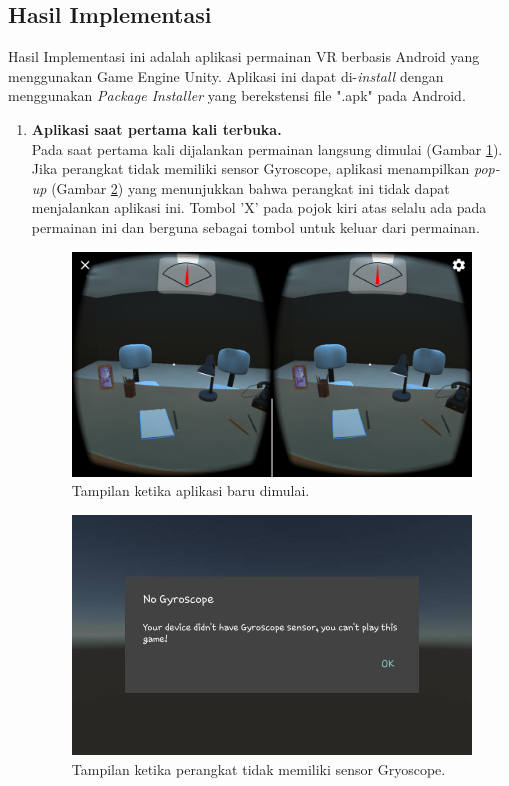 \subsection{Hasil Implementasi}

Hasil Implementasi ini adalah aplikasi permainan VR berbasis Android yang menggunakan Game Engine Unity. Aplikasi ini dapat di-\textit{install} dengan menggunakan \textit{Package Installer} yang berekstensi file ".apk" pada Android.

\begin{enumerate}
    \item \textbf{Aplikasi saat pertama kali terbuka.}\\
    Pada saat pertama kali dijalankan permainan langsung dimulai (Gambar \ref{fig:aplikasi_mulai}). Jika perangkat tidak memiliki sensor Gyroscope, aplikasi menampilkan \textit{pop-up} (Gambar \ref{fig:no_gyroscope}) yang menunjukkan bahwa perangkat ini tidak dapat menjalankan aplikasi ini. Tombol 'X' pada pojok kiri atas selalu ada pada permainan ini dan berguna sebagai tombol untuk keluar dari permainan.
    
    \begin{figure}[htbp]
    \centering
    \includegraphics[scale=0.23]{Gambar/screenshot-aplikasi/aplikasi-mulai.png}
    \caption{Tampilan ketika aplikasi baru dimulai.} 
    \label{fig:aplikasi_mulai}
    \end{figure}
    
    \begin{figure}[htbp]
    \centering
    \includegraphics[scale=0.3]{Gambar/screenshot-aplikasi/no-gyroscope.jpg}
    \caption{Tampilan ketika perangkat tidak memiliki sensor Gryoscope.} 
    \label{fig:no_gyroscope}
    \end{figure}
    

\end{enumerate}
